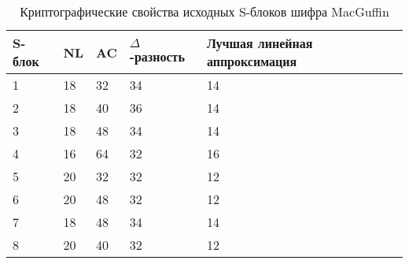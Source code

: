 \begin{table}
    \caption{Криптографические свойства исходных S-блоков шифра MacGuffin}
    \label{table:sbox_MacGuffin}
    \centering\begin{tabular}{| m{2cm} | m{2cm} | m{2cm} | m{4.4cm} | m{4.4cm} |}
        \hline
        S-блок  & NL    & AC    & $\Delta$-разность & Лучшая линейная аппроксимация \\ \hline
        1       & 18    & 32    & 34                & 14                        \\ \hline
        2       & 18    & 40    & 36                & 14                        \\ \hline
        3       & 18    & 48    & 34                & 14                        \\ \hline
        4       & 16    & 64    & 32                & 16                        \\ \hline
        5       & 20    & 32    & 32                & 12                        \\ \hline
        6       & 20    & 48    & 32                & 12                        \\ \hline
        7       & 18    & 48    & 34                & 14                        \\ \hline
        8       & 20    & 40    & 32                & 12                        \\ \hline
    \end{tabular}
\end{table}

